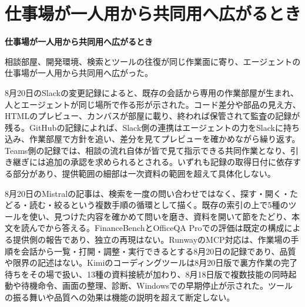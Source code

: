 \section{仕事場が一人用から共同用へ広がるとき}
\begin{wideflow}
{\Large\bfseries 仕事場が一人用から共同用へ広がるとき}\par
\smallskip
{\color{SurveyMuted}相談部屋、開発環境、検索とツールの往復が同じ作業面に寄り、エージェントの仕事場が一人用から共同用へ広がった。}\par
\end{wideflow}

\noindent 8月20日のSlackの変更記録によると、既存の会話から専用の作業部屋が生まれ、人とエージェントが同じ場所で作る形が示された。コード差分や部品の見え方、HTMLのプレビュー、カンバスが部屋に載り、終われば保管されて監査の記録が残る。GitHubの記録によれば、Slack側の連携はエージェントの力をSlackに持ち込み、作業部屋で方針を追い、差分を見てプレビューを確かめながら繰り返す。Teams側の記録では、相談の流れ自体が皆で見て指示できる共同作業となり、引き継ぎには追加の承認を求められるとされる。いずれも記録の取得日付に依存する部分があり、提供範囲の細部は一次資料の範囲を超えて具体化しない。 \cite{w2026w34w34eventc012,w2026w34w34eventc100,w2026w34w34eventc101}\par\medskip

\noindent 8月20日のMistralの記事は、検索を一度の問い合わせではなく、探す・開く・たどる・読む・絞るという複数手順の循環として描く。既存の索引の上で5種のツールを使い、見つけた内容を確かめて問いを磨き、資料を開いて節をたどり、本文を読んでから答える。FinanceBenchとOfficeQA Proでの評価は既定の構成による提供側の報告であり、独立の再現はない。RunwayのMCP対応は、作業場の手順を会話から一覧・打開・調整・実行できるとする8月20日の記録であり、品質や限界の記述はない。Kimiのコーディングツールは8月20日版で裏方作業の完了待ちをその場で扱い、13種の資料接続が加わり、8月18日版で複数技能の同時起動や待機命令、画面の整理、診断、Windowsでの早期停止が示された。ツールの振る舞いや品質への効果は機能の説明を超えて断定しない。 \cite{w2026w34w34eventc019,w2026w34w34eventc047,w2026w34w34eventrefreshkimicodecliv038v037}\par\medskip

